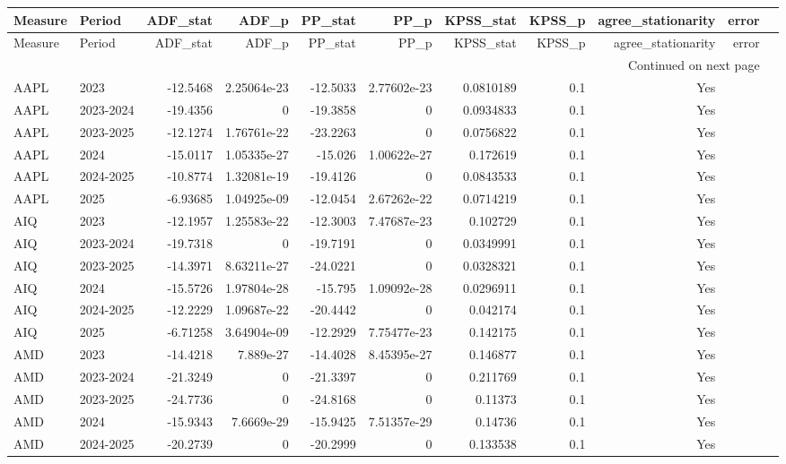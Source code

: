 \begin{longtable}{llrrrrrrrrl}
\toprule
Measure & Period & ADF_stat & ADF_p & PP_stat & PP_p & KPSS_stat & KPSS_p & agree_stationarity & error \\
\midrule
\endfirsthead
\toprule
Measure & Period & ADF_stat & ADF_p & PP_stat & PP_p & KPSS_stat & KPSS_p & agree_stationarity & error \\
\midrule
\endhead
\midrule
\multicolumn{10}{r}{Continued on next page} \\
\midrule
\endfoot
\bottomrule
\endlastfoot
AAPL & 2023 & -12.5468 & 2.25064e-23 & -12.5033 & 2.77602e-23 & 0.0810189 & 0.1 & Yes &  \\
AAPL & 2023-2024 & -19.4356 & 0 & -19.3858 & 0 & 0.0934833 & 0.1 & Yes &  \\
AAPL & 2023-2025 & -12.1274 & 1.76761e-22 & -23.2263 & 0 & 0.0756822 & 0.1 & Yes &  \\
AAPL & 2024 & -15.0117 & 1.05335e-27 & -15.026 & 1.00622e-27 & 0.172619 & 0.1 & Yes &  \\
AAPL & 2024-2025 & -10.8774 & 1.32081e-19 & -19.4126 & 0 & 0.0843533 & 0.1 & Yes &  \\
AAPL & 2025 & -6.93685 & 1.04925e-09 & -12.0454 & 2.67262e-22 & 0.0714219 & 0.1 & Yes &  \\
AIQ & 2023 & -12.1957 & 1.25583e-22 & -12.3003 & 7.47687e-23 & 0.102729 & 0.1 & Yes &  \\
AIQ & 2023-2024 & -19.7318 & 0 & -19.7191 & 0 & 0.0349991 & 0.1 & Yes &  \\
AIQ & 2023-2025 & -14.3971 & 8.63211e-27 & -24.0221 & 0 & 0.0328321 & 0.1 & Yes &  \\
AIQ & 2024 & -15.5726 & 1.97804e-28 & -15.795 & 1.09092e-28 & 0.0296911 & 0.1 & Yes &  \\
AIQ & 2024-2025 & -12.2229 & 1.09687e-22 & -20.4442 & 0 & 0.042174 & 0.1 & Yes &  \\
AIQ & 2025 & -6.71258 & 3.64904e-09 & -12.2929 & 7.75477e-23 & 0.142175 & 0.1 & Yes &  \\
AMD & 2023 & -14.4218 & 7.889e-27 & -14.4028 & 8.45395e-27 & 0.146877 & 0.1 & Yes &  \\
AMD & 2023-2024 & -21.3249 & 0 & -21.3397 & 0 & 0.211769 & 0.1 & Yes &  \\
AMD & 2023-2025 & -24.7736 & 0 & -24.8168 & 0 & 0.11373 & 0.1 & Yes &  \\
AMD & 2024 & -15.9343 & 7.6669e-29 & -15.9425 & 7.51357e-29 & 0.14736 & 0.1 & Yes &  \\
AMD & 2024-2025 & -20.2739 & 0 & -20.2999 & 0 & 0.133538 & 0.1 & Yes &  \\

\end{longtable}
